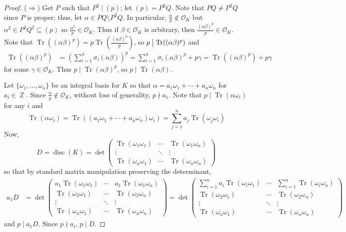 \documentclass[11pt, a4paper]{memoir}
\DeclareMathOperator{\Z}{{\mathbb{Z}}}
\newcommand{\impendc}{\hspace{0.3cm}}
\newcommand{\iimpr}{($\Rightarrow$)}
\newcommand{\impr}{\iimpr\impendc}
\renewcommand{\div}{\bigm|}
\theoremstyle{change}
\theoremstyle{plain}
\theoremstyle{nonumberplain}
\newtheorem{proof}{Proof}
\DeclareMathOperator{\disc}{disc}
\DeclareMathOperator{\Tr}{Tr}
\numberwithin{equation}{section}
\begin{document}
\begin{proof}
    \impr
    Get $P$ such that $P^2\mid(p)$; let $(p)=P^2Q$.
    Note that $PQ\neq  P^2Q$ since $P$ is proper; thus, let $\alpha\in PQ\setminus P^2Q$.
    In particular, $\frac{\alpha}{p}\notin\mathcal{O}_K$ but $\alpha^2\in P^2Q^2\subseteq (p)$ so $\frac{\alpha^2}{p}\in\mathcal{O}_K$.
    Thus if $\beta\in\mathcal{O}_K$ is arbitrary, then $\frac{(\alpha\beta)^p}{p}\in\mathcal{O}_K$.
    Note that $\Tr((\alpha\beta)^p)=p\Tr\left(\frac{(\alpha\beta)^p}{p}\right)$, so $p\div \Tr((\alpha\beta)^p)$ and
    \begin{align*}
        \Tr\left((\alpha\beta)^p\right) &=\left(\sum_{i=1}^n\sigma_i(\alpha\beta)\right)^p=\sum_{i=1}^n\sigma_i(\alpha\beta)^p+p\gamma= \Tr((\alpha\beta)^p)+p\gamma
    \end{align*}
    for some $\gamma\in\mathcal{O}_K$.
    Thus $p\mid\Tr(\alpha\beta)^p$, so $p\mid\Tr(\alpha\beta)$.

    Let $\{\omega_1,\ldots,\omega_n\}$ be an integral basis for $K$ so that $\alpha=a_1\omega_1+\cdots+a_n\omega_n$ for $a_i\in\Z$.
    Since $\frac{\alpha}{p}\notin\mathcal{O}_K$, without loss of generality, $p\nmid a_1$.
    Note that $p\mid\Tr(\alpha\omega_i)$ for any $i$ and
    \begin{equation*}
        \Tr(\alpha\omega_i)=\Tr((a_1\omega_1+\cdots+a_n\omega_n)\omega_i)=\sum_{j=1}^n a_j\Tr(\omega_j\omega_i)
    \end{equation*}
    Now,
    \begin{equation*}
        D=\disc(K)=\det
        \begin{pmatrix}
            \Tr(\omega_1\omega_1) &\cdots&\Tr(\omega_1\omega_n)\\
            \vdots&\ddots&\vdots\\
            \Tr(\omega_n\omega_1) &\cdots&\Tr(\omega_n\omega_n)
        \end{pmatrix}
    \end{equation*}
    so that by standard matrix manipulation preserving the determinant,
    \begin{align*}
        a_1D &=\det
        \begin{pmatrix}
            a_1\Tr(\omega_1\omega_1) &\cdots&a_1\Tr(\omega_1\omega_n)\\
            \Tr(\omega_2\omega_1) &\cdots&\Tr(\omega_2\omega_n)\\
            \vdots&\ddots&\vdots\\
            \Tr(\omega_n\omega_1) &\cdots&\Tr(\omega_n\omega_n)
        \end{pmatrix}
        =\det
        \begin{pmatrix}
            \sum_{i=1}^n a_i\Tr(\omega_i\omega_1) &\cdots & \sum_{i=1}^n\Tr(\omega_i\omega_n)\\
            \Tr(\omega_2\omega_1) &\cdots&\Tr(\omega_2\omega_n)\\
            \vdots&\ddots&\vdots\\
            \Tr(\omega_n\omega_1) &\cdots&\Tr(\omega_n\omega_n)
        \end{pmatrix}
    \end{align*}
    and $p\mid a_1D$.
    Since $p\nmid a_i$, $p\mid D$.


\end{proof}
\end{document}
